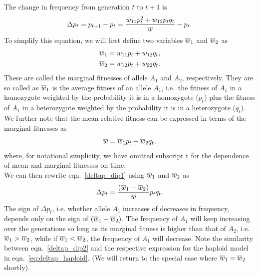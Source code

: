 The change in frequency from generation $t$ to $t+1$ is
\begin{equation}
\Delta p_t = p_{t+1} -p_{t}= \frac{w_{11} p_t^2 + w_{12} p_tq_t}{\overline{w}} - p_t. \label{deltap_dip1}
\end{equation}
To simplify this equation, we will first define two variables $\overline{w}_1$ and $\overline{w}_2$ as
\begin{eqnarray}
	\overline{w}_1 & = w_{11} p_t + w_{12} q_t, \\
	\overline{w}_2 & =  w_{12} p_t+ w_{22} q_t.
\end{eqnarray}
These are called the marginal fitnesses of allele $A_1$
and $A_2$, respectively. They are so called as $\overline{w}_1$ is the
average fitness of an allele $A_1$, i.e.\ the fitness of $A_1$ in a
homozygote weighted by the probability it is in a homozygote ($p_t$)
plus the fitness of $A_1$ in a
heterozygote weighted by the probability it is in a heterozygote ($q_t$).
We further note that the mean relative fitness can be expressed in terms of the marginal fitnesses as
\begin{equation}
	\label{eq:meanFitInTermsOfMargFit}
	\overline{w} = \overline{w}_1 p_t + \overline{w}_2 q_t,
\end{equation}
where, for notational simplicity, we have omitted subscript t for the dependence of mean and marginal fitnesses on time.\\

We can then rewrite eqn.\ \eqref{deltap_dip1} using $\overline{w}_1$ and $\overline{w}_2$ as
\begin{equation}
	\Delta p_t = \frac{ (\overline{w}_1-\overline{w}_2)}{\overline{w}} p_t q_t.
	\label{deltap_dip2}
\end{equation}
The sign of $\Delta p_t$, i.e. whether allele $A_1$ increases of decreases
in frequency, depends only on the sign of $(\overline{w}_1-\overline{w}_2)$.
The frequency of $A_1$ will keep increasing over the generations so
long as its marginal fitness is higher than that of $A_2$,
i.e.\ $\overline{w}_1 > \overline{w}_2$, while if $\overline{w}_1 < \overline{w}_2$, the
frequency of $A_1$ will decrease. Note the similarity between eqn.\ \eqref{deltap_dip2} and the respective expression for the haploid model in eqn.\ \eqref{eq:deltap_haploid}. (We will return to the
special case where $\overline{w}_1 = \overline{w}_2$ shortly).\\


